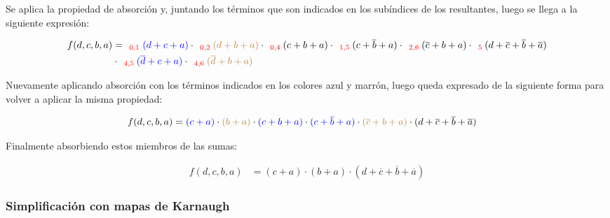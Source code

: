 Se aplica la propiedad de absorci\'on y, juntando los t\'erminos que son indicados en los sub\'indices de los 
resultantes, luego se llega a la siguiente expresi\'on:

\begin{equation*}
\begin{align*}
f(d,c,b,a) & = _{\ \ \color{red} 0,1} {\color{blue} (d+c+a)}
\cdot _{\ \ \color{red} 0,2} {\color{brown} (d+b+a)}
\cdot _{\ \ \color{red} 0,4} {(c+b+a)}
\cdot _{\ \ \color{red} 1,5} {(c+\overline{b}+a)}
\cdot _{\ \ \color{red} 2,6} {(\overline{c}+b+a)}
\cdot _{\ \ \color{red} 5} {(d+\overline{c}+\overline{b}+\overline{a})} \\
& \cdot _{\ \ \color{red} 4,5} {\color{blue} (\overline{d}+c+a)}
\cdot _{\ \ \color{red} 4,6} {\color{brown} (\overline{d}+b+a)}
\end{align*}
\end{equation*}

Nuevamente aplicando absorci\'on con los t\'erminos indicados en los colores azul y marr\'on,
luego queda expresado de la siguiente forma para volver a aplicar la misma propiedad:

\begin{equation*}
\begin{align*}
f(d,c,b,a) & = {\color{blue} (c+a)}
\cdot {\color{brown} (b+a)}
\cdot {\color{blue} (c+b+a)}
\cdot {\color{blue} (c+\overline{b}+a)}
\cdot {\color{brown} (\overline{c}+b+a)}
\cdot {(d+\overline{c}+\overline{b}+\overline{a})} 
\end{align*}
\end{equation*}

Finalmente absorbiendo estos miembros de las sumas:

\begin{equation*}
    \begin{align*}
    f(d,c,b,a) & = {(c+a)}
    \cdot {(b+a)}
    \cdot {(d+\overline{c}+\overline{b}+\overline{a})} 
    \end{align*}
    \end{equation*}

\subsubsection{Simplificación con mapas de Karnaugh}

\begin{figure}[H]
    \centering
    \begin{Karnaugh}
    \end{Karnaugh}
\end{figure}

